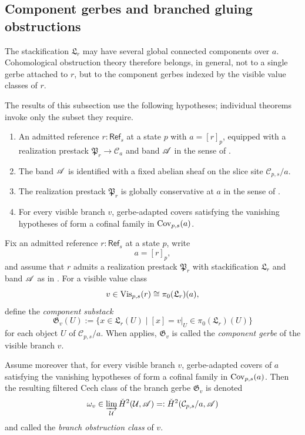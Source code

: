 \subsection{Component gerbes and branched gluing obstructions}

The stackification $\mathfrak L_r$ may have several global connected components over $a$. Cohomological obstruction theory therefore belongs, in general, not to a single gerbe attached to $r$, but to the component gerbes indexed by the visible value classes of $r$.

The results of this subsection use the following hypotheses; individual theorems invoke only the subset they require.

\begin{enumerate}[label=\textup{(H\arabic*)},nosep]
\item\label{hyp:admitted-prestack} An admitted reference $r:\mathsf{Ref}_s$ at a state $p$ with $a=[r]_p$, equipped with a realization prestack $\mathfrak P_r \to \mathcal C_a$ and band $\mathscr{A}$ in the sense of .
\item\label{hyp:band-identification} The band $\mathscr{A}$ is identified with a fixed abelian sheaf on the slice site $\mathcal C_{p,s}/a$.
\item\label{hyp:global-conservativity} The realization prestack $\mathfrak P_r$ is globally conservative at $a$ in the sense of .
\item\label{hyp:cofinal-gerbe-adapted} For every visible branch $v$, gerbe-adapted covers satisfying the vanishing hypotheses of  form a cofinal family in $\mathrm{Cov}_{p,s}(a)$.
\end{enumerate}

\begin{definition}\label{def:compatible-realization-stack}\label{def:cech-gluing-obstruction}
Fix an admitted reference $r:\mathsf{Ref}_s$ at a state $p$, write
\[
a=[r]_p,
\]
and assume that $r$ admits a realization prestack $\mathfrak P_r$ with stackification $\mathfrak L_r$ and band $\mathscr{A}$ as in . For a visible value class
\[
v\in \mathrm{Vis}_{p,s}(r)\cong \pi_0(\mathfrak L_r)(a),
\]
define the \emph{component substack}
\[
\mathfrak G_v(U):=\{x\in \mathfrak L_r(U)\mid [x]=v|_U\in \pi_0(\mathfrak L_r)(U)\}
\]
for each object $U$ of $\mathcal C_{p,s}/a$. When  applies, $\mathfrak G_v$ is called the \emph{component gerbe} of the visible branch $v$.

Assume moreover that, for every visible branch $v$, gerbe-adapted covers of $a$ satisfying the vanishing hypotheses of  form a cofinal family in $\mathrm{Cov}_{p,s}(a)$. Then the resulting filtered Cech class of the branch gerbe $\mathfrak G_v$ is denoted
\[
\omega_v\in \varinjlim_{\mathcal U}\check{H}^2(\mathcal U,\mathscr{A})=:\check{H}^2(\mathcal C_{p,s}/a,\mathscr{A})
\]
and called the \emph{branch obstruction class} of $v$.
\end{definition}

